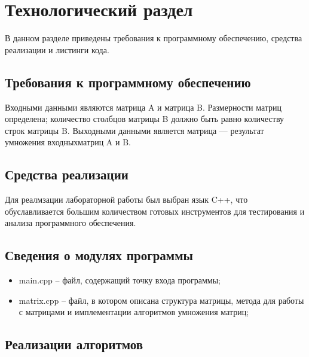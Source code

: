 \chapter{Технологический раздел}
\label{cha:impl}

В данном разделе приведены требования к программному обеспечению, средства реализации и листинги кода. 

\section{Требования к программному обеспечению}
Входными данными являются матрица A и матрица B. Размерности матриц определена; количество столбцов матрицы B должно быть равно количеству строк матрицы B. Выходными данными является матрица --- результат умножения входныхматриц A и B.

\section{Средства реализации}

Для реалмзации лабораторной работы был выбран язык C++, что обуславливается большим количеством готовых инструментов для тестирования и анализа программного обеспечения. 

\section{Сведения о модулях программы}

\begin{itemize}
    \item main.cpp -- файл, содержащий точку входа программы; 
    \item matrix.cpp -- файл, в котором описана структура матрицы, метода для работы с матрицами и имплементации алгоритмов умножения матриц;
    
\end{itemize}

\section{Реализации алгоритмов}

